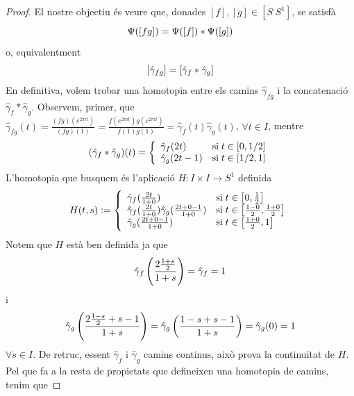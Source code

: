 \documentclass[../main.tex]{subfiles}
\begin{document}
\begin{proof}
El nostre objectiu és veure que, donades $[f],[g]\in[S^,S^1]$, se satisfà
\begin{equation}
    \notag
    \Psi([fg])=\Psi([f])*\Psi([g])
\end{equation}
o, equivalentment
\begin{equation}
    \notag
    [\hat{\gamma}_{fg}] = [\hat{\gamma}_f*\hat{\gamma}_g]
\end{equation}
En definitiva, volem trobar una homotopia entre els camins $\hat{\gamma}_{fg}$ i la concatenació $\hat{\gamma}_f*\hat{\gamma}_g$. Observem, primer, que $\hat{\gamma}_{fg}(t) = \frac{(fg)(e^{2\pi it})}{(fg)(1)} = \frac{f(e^{2\pi it})g(e^{2\pi it})}{f(1)g(1)} = \hat{\gamma}_f(t)\hat{\gamma}_g(t)$, $\forall t\in I$, mentre
\begin{equation}
    \notag
    (\hat{\gamma}_f*\hat{\gamma}_g)(t) = \left\{
    \begin{array}{ll}
        \hat{\gamma}_f(2t) & \mathrm{si}\;t\in[0,1/2] \\
        \hat{\gamma}_g(2t-1) & \mathrm{si}\;t\in [1/2,1]
    \end{array}
    \right.
\end{equation}
L'homotopia que busquem és l'aplicació $H:I\times I\rightarrow S^1$ definida
\begin{equation}
    \notag
    H(t,s):=\left\{
    \begin{array}{ll}
        \hat{\gamma}_f(\frac{2t}{1+0}) & \mathrm{si}\;t\in \left[0,\frac{1}{2}\right] \\
        \hat{\gamma}_f(\frac{2t}{1+0})\hat{\gamma}_g(\frac{2t+0-1}{1+0}) & \mathrm{si}\;t\in \left[\frac{1-0}{2},\frac{1+0}{2}\right] \\
        \hat{\gamma}_g(\frac{2t+0-1}{1+0}) & \mathrm{si}\;t\in\left[\frac{1+0}{2},1\right]
    \end{array}
    \right.
\end{equation}
Notem que $H$ està ben definida ja que
\begin{equation}
    \notag
    \hat{\gamma}_f\left(\frac{2\frac{1+s}{2}}{1+s}\right) = \hat{\gamma}_f=1
\end{equation}
i
\begin{equation}
    \notag
    \hat{\gamma}_g\left(\frac{2\frac{1-s}{2}+s-1}{1+s}\right)= \hat{\gamma}_g\left(\frac{1-s+s-1}{1+s}\right) = \hat{\gamma}_g(0) = 1
\end{equation}
$\forall s\in I$. De retruc, essent $\hat{\gamma}_f$ i $\hat{\gamma}_g$ camins continus, això prova la continuïtat de $H$. Pel que fa a la resta de propietats que defineixen una homotopia de camins, tenim que

\end{proof}
\end{document}
